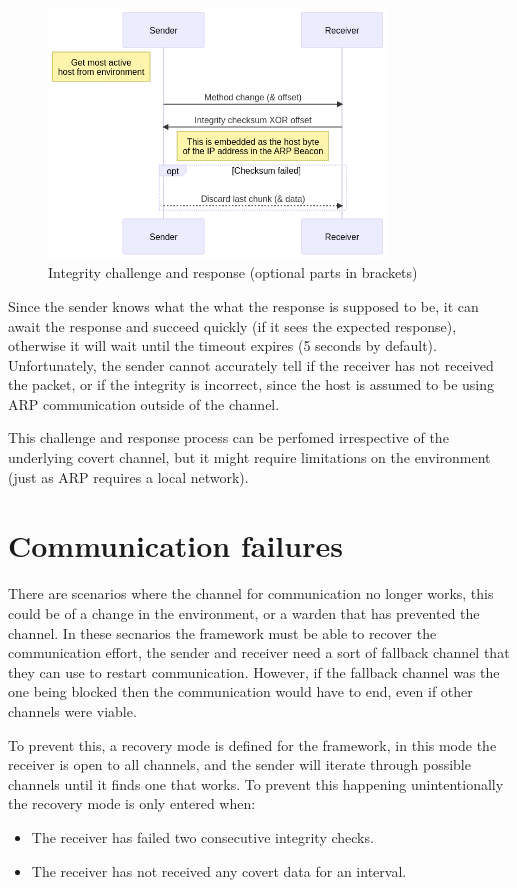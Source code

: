 \begin{figure}[h]
    \centering
    \includegraphics[width=0.8\textwidth]{fig/Integrity.png}
    \caption{Integrity challenge and response (optional parts in brackets)}
    \label{fig:integrity}
\end{figure}

Since the sender knows what the what the response is supposed to be, it can await the response and succeed quickly (if it sees the expected response), otherwise it will wait until the timeout expires (5 seconds by default). Unfortunately, the sender cannot accurately tell if the receiver has not received the packet, or if the integrity is incorrect, since the host is assumed to be using ARP communication outside of the channel.

This challenge and response process can be perfomed irrespective of the underlying covert channel, but it might require limitations on the environment (just as ARP requires a local network). 

\section{Communication failures}

There are scenarios where the channel for communication no longer works, this could be of a change in the environment, or a warden that has prevented the channel. In these secnarios the framework must be able to recover the communication effort, the sender and receiver need a sort of fallback channel that they can use to restart communication. However, if the fallback channel was the one being blocked then the communication would have to end, even if other channels were viable.

To prevent this, a recovery mode is defined for the framework, in this mode the receiver is open to all channels, and the sender will iterate through possible channels until it finds one that works. To prevent this happening unintentionally the recovery mode is only entered when:
\begin{itemize}
    \item The receiver has failed two consecutive integrity checks.
    \item The receiver has not received any covert data for an interval.
\end{itemize}

